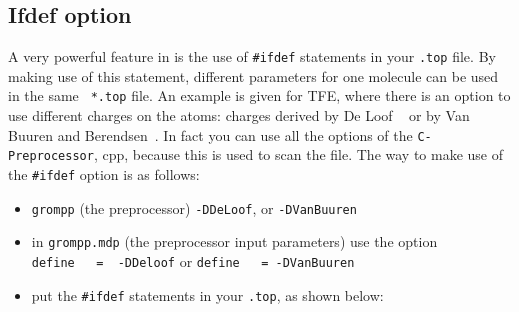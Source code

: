 \subsection{Ifdef option}
\label{subsec:ifdef}
A very powerful feature in {\gromacs} is the use of \verb'#ifdef'
statements in your {\tt *.top} file. By making use of this statement,
different parameters for one molecule can be used in the same {\tt
*.top} file. An example is given for TFE, where there is an option to
use different charges on the atoms: charges derived by De Loof
{\etal}~\cite{Loof92} or by Van Buuren and
Berendsen~\cite{Buuren93a}. In fact you can use all the options of the
{\tt C-Preprocessor}, cpp, because this is used to scan the file.  The
way to make use of the \verb'#ifdef' option is as follows:
\begin{itemize}
\item {\tt grompp} (the {\gromacs} preprocessor) \verb'-DDeLoof', or 
      \verb'-DVanBuuren'
\item in {\tt grompp.mdp} (the {\gromacs} preprocessor input
      parameters)  use the option \\
      \verb'define   =  -DDeloof' or \verb'define   = -DVanBuuren'
\item put the {\tt \#ifdef} statements in your {\tt *.top}, as
      shown below: 
\end{itemize}
